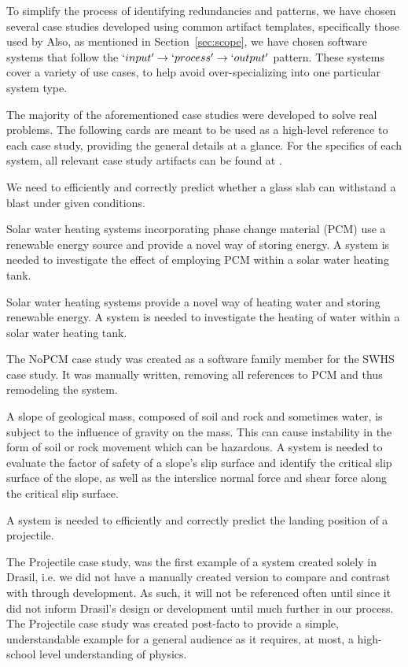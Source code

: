 To simplify the process of identifying redundancies and patterns, we have chosen
several case studies developed using common artifact templates, specifically 
those used by \smithea{}  Also, as mentioned in 
Section~\ref{sec:scope}, we have chosen software systems that follow the 
$`input' \rightarrow `process' \rightarrow `output'$ pattern. These systems 
cover a variety of use cases, to help avoid over-specializing into one 
particular system type. 

The majority of the aforementioned case studies were developed to solve real
problems. The following cards are meant to be used as a high-level reference to 
each case study, providing the general details at a glance. For the specifics 
of each system, all relevant case study artifacts can be found at .

\card{\gb}
{We need to efficiently and correctly predict whether a glass 
slab can withstand a blast under given conditions.}
{}

\card{\sw}
{Solar water heating systems incorporating phase change 
 material (PCM) use a renewable energy source and provide a novel way of 
 storing energy. A system is needed to investigate the effect of employing PCM
 within a solar water heating tank.}
{}

\card{\np}
{Solar water heating systems provide a novel way of 
heating water and storing renewable energy. A system is needed to investigate
the heating of water within a solar water heating tank.}
{}

The NoPCM case study was created as a software family member for the SWHS case
study. It was manually written, removing all references to PCM and thus 
remodeling the system.

\card{\sp}
{A slope of geological mass, composed of soil and rock 
 and sometimes water, is subject to the influence of gravity on the mass. 
 This can cause instability in the form of soil or rock movement which can
 be hazardous. A system is needed to evaluate the factor of safety of 
 a slope's slip surface and identify the critical slip surface of the slope, 
 as well as the interslice normal force and shear force along the critical 
 slip surface.}
{}

\card{\pr}
{A system is needed to efficiently and correctly predict
 the landing position of a projectile.}
{}

The Projectile case study, was the first example of a system 
created solely in Drasil, i.e. we did not have a manually created version to 
compare and contrast with through development. As such, it will not be 
referenced often until  since it did not inform Drasil's 
design or development until much further in our process. The Projectile case 
study was created post-facto to provide a simple, understandable example for a 
general audience as it requires, at most, a high-school level understanding of 
physics. 

